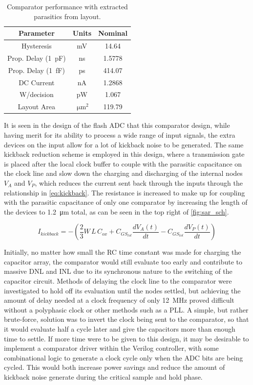 \documentclass[11pt,letterpaper]{article}
\begin{document}
\begin{table}[htbp!]
    \centering
    \begin{tabular}{ccc}
    \toprule
        Parameter & Units & Nominal \\
    \midrule
        Hysteresis & mV & 14.64 \\
        Prop. Delay (\qty{1}{\pF}) & ns & 1.5778 \\
        Prop. Delay (\qty{1}{\fF}) & ps & 414.07 \\
        DC Current & nA & 1.2868 \\
        W/decision & pW & 1.067 \\
        Layout Area & \(\qty{}{\um^2}\) & 119.79 \\
    \bottomrule
        
    \end{tabular}
    \caption{Comparator performance with extracted parasitics from layout.}\label{tab:comp_perf}
\end{table}

It is seen in the design of the flash ADC that this comparator design, while having merit for its ability to process a wide range of input signals, the extra devices on the input allow for a lot of kickback noise to be generated. The same kickback reduction scheme is employed in this design, where a transmission gate is placed after the local clock buffer to couple with the parasitic capacitance on the clock line and slow down the charging and discharging of the internal nodes \(V_A\) and \(V_P\), which reduces the current sent back through the inputs through the relationship in \cref{eq:kickback}. The resistance is increased to make up for coupling with the parasitic capacitance of only one comparator by increasing the length of the devices to \qty{1.2}{\um} total, as can be seen in the top right of \cref{fig:sar_sch}.

\begin{equation}
    I_{kickback} = -\left(\frac{2}{3}W\,L\,C_{ox} + C_{GS_{tot}}\frac{dV_A(t)}{dt} - C_{GS_{tot}}\frac{dV_P(t)}{dt}\right)\label{eq:kickback}
\end{equation}

Initially, no matter how small the RC time constant was made for charging the capacitor array, the comparator would still evaluate too early and contribute to massive DNL and INL due to its synchronous nature to the switching of the capacitor circuit. Methods of delaying the clock line to the comparator were investigated to hold off its evaluation until the nodes settled, but achieving the amount of delay needed at a clock frequency of only \qty{12}{\MHz} proved difficult without a polyphasic clock or other methods such as a PLL\@. A simple, but rather brute-force, solution was to invert the clock being sent to the comparator, so that it would evaluate half a cycle later and give the capacitors more than enough time to settle. If more time were to be given to this design, it may be desirable to implement a comparator driver within the Verilog controller, with some combinational logic to generate a clock cycle only when the ADC bits are being cycled. This would both increase power savings and reduce the amount of kickback noise generate during the critical sample and hold phase.
\end{document}
